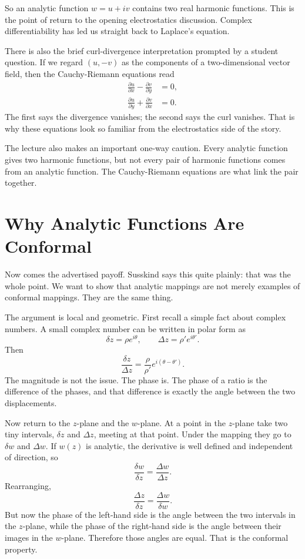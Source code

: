 So an analytic function \(w=u+iv\) contains two real harmonic functions. This is the point of return to the opening electrostatics discussion. Complex differentiability has led us straight back to Laplace's equation.

There is also the brief curl-divergence interpretation prompted by a student question. If we regard \((u,-v)\) as the components of a two-dimensional vector field, then the Cauchy-Riemann equations read
\begin{align}
\frac{\partial u}{\partial x}
-
\frac{\partial v}{\partial y}
&=0, \\
\frac{\partial u}{\partial y}
+
\frac{\partial v}{\partial x}
&=0.
\end{align}
The first says the divergence vanishes; the second says the curl vanishes. That is why these equations look so familiar from the electrostatics side of the story.

The lecture also makes an important one-way caution. Every analytic function gives two harmonic functions, but not every pair of harmonic functions comes from an analytic function. The Cauchy-Riemann equations are what link the pair together.

\section{Why Analytic Functions Are Conformal}

Now comes the advertised payoff. Susskind says this quite plainly: that was the whole point. We want to show that analytic mappings are not merely examples of conformal mappings. They are the same thing.

The argument is local and geometric. First recall a simple fact about complex numbers. A small complex number can be written in polar form as
\begin{equation}
\delta z=\rho e^{i\theta},
\qquad
\Delta z=\rho' e^{i\theta'}.
\end{equation}
Then
\begin{equation}
\frac{\delta z}{\Delta z}
=
\frac{\rho}{\rho'}e^{i(\theta-\theta')}.
\end{equation}
The magnitude is not the issue. The phase is. The phase of a ratio is the difference of the phases, and that difference is exactly the angle between the two displacements.

Now return to the \(z\)-plane and the \(w\)-plane. At a point in the \(z\)-plane take two tiny intervals, \(\delta z\) and \(\Delta z\), meeting at that point. Under the mapping they go to \(\delta w\) and \(\Delta w\). If \(w(z)\) is analytic, the derivative is well defined and independent of direction, so
\begin{equation}
\frac{\delta w}{\delta z}
=
\frac{\Delta w}{\Delta z}.
\end{equation}
Rearranging,
\begin{equation}
\frac{\Delta z}{\delta z}
=
\frac{\Delta w}{\delta w}.
\end{equation}
But now the phase of the left-hand side is the angle between the two intervals in the \(z\)-plane, while the phase of the right-hand side is the angle between their images in the \(w\)-plane. Therefore those angles are equal. That is the conformal property.

